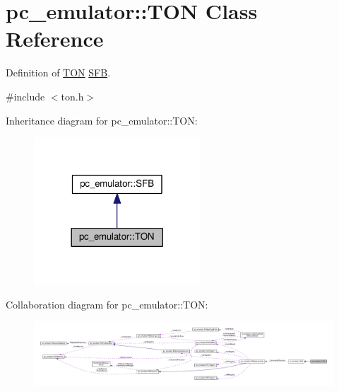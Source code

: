 \hypertarget{classpc__emulator_1_1TON}{}\section{pc\+\_\+emulator\+:\+:T\+ON Class Reference}
\label{classpc__emulator_1_1TON}


Definition of \hyperlink{classpc__emulator_1_1TON}{T\+ON} \hyperlink{classpc__emulator_1_1SFB}{S\+FB}.  




{\ttfamily \#include $<$ton.\+h$>$}



Inheritance diagram for pc\+\_\+emulator\+:\+:T\+ON\+:\nopagebreak
\begin{figure}[H]
\begin{center}
\leavevmode
\includegraphics[width=177pt]{classpc__emulator_1_1TON__inherit__graph}
\end{center}
\end{figure}


Collaboration diagram for pc\+\_\+emulator\+:\+:T\+ON\+:\nopagebreak
\begin{figure}[H]
\begin{center}
\leavevmode
\includegraphics[width=350pt]{classpc__emulator_1_1TON__coll__graph}
\end{center}
\end{figure}
